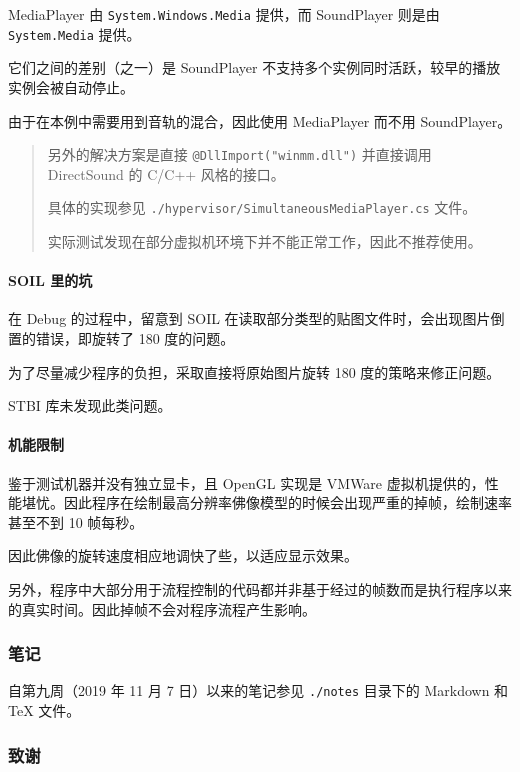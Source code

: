 \documentclass[
]{article}
\begin{document}
MediaPlayer 由 \texttt{System.Windows.Media} 提供，而 SoundPlayer 则是由
\texttt{System.Media} 提供。

它们之间的差别（之一）是 SoundPlayer
不支持多个实例同时活跃，较早的播放实例会被自动停止。

由于在本例中需要用到音轨的混合，因此使用 MediaPlayer 而不用
SoundPlayer。

\begin{quote}
另外的解决方案是直接 \texttt{@DllImport("winmm.dll")} 并直接调用
DirectSound 的 C/C++ 风格的接口。

具体的实现参见 \texttt{./hypervisor/SimultaneousMediaPlayer.cs} 文件。

实际测试发现在部分虚拟机环境下并不能正常工作，因此不推荐使用。
\end{quote}

\hypertarget{header-n370}{%
\paragraph{SOIL 里的坑}\label{header-n370}}

在 Debug 的过程中，留意到 SOIL
在读取部分类型的贴图文件时，会出现图片倒置的错误，即旋转了 180
度的问题。

为了尽量减少程序的负担，采取直接将原始图片旋转 180 度的策略来修正问题。

STBI 库未发现此类问题。

\hypertarget{header-n740}{%
\paragraph{机能限制}\label{header-n740}}

鉴于测试机器并没有独立显卡，且 OpenGL 实现是 VMWare
虚拟机提供的，性能堪忧。因此程序在绘制最高分辨率佛像模型的时候会出现严重的掉帧，绘制速率甚至不到
10 帧每秒。

因此佛像的旋转速度相应地调快了些，以适应显示效果。

另外，程序中大部分用于流程控制的代码都并非基于经过的帧数而是执行程序以来的真实时间。因此掉帧不会对程序流程产生影响。

\hypertarget{header-n735}{%
\subsubsection{笔记}\label{header-n735}}

自第九周（2019 年 11 月 7 日）以来的笔记参见 \texttt{./notes} 目录下的
Markdown 和 TeX 文件。

\hypertarget{header-n755}{%
\subsubsection{致谢}\label{header-n755}}
\end{document}
